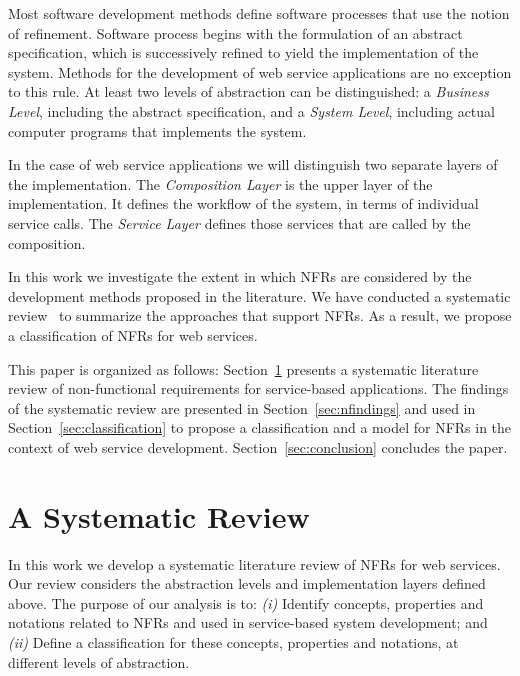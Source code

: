\documentclass[english,12pt]{article}
\begin{document}
Most software development methods define software processes that use the notion of refinement.
Software process begins with the formulation of an abstract specification, which is successively refined to yield the implementation of the system.
Methods for the development of web service applications are no exception to this rule.
At least two levels of abstraction can be distinguished: a \textit{Business Level}, including the abstract specification, and a \textit{System Level}, including actual computer programs that implements the system.

In the case of web service applications we will distinguish two separate layers of the implementation.
The \textit{Composition Layer} is the upper layer of the implementation. 
It defines the workflow of the system, in terms of individual service calls.
The \textit{Service Layer} defines those services that are called by the composition.

\bigskip
 
In this work we investigate the extent in which NFRs are considered by the development methods proposed in the literature.
We have conducted a systematic review~\cite{Kitchenham08} to summarize the approaches that support NFRs.
As a result, we propose a classification of NFRs for web services.

\bigskip

This paper is organized as follows: 
Section~\ref{sec:sr} presents a systematic literature review of non-functional requirements for service-based applications.
The findings of the systematic review are presented in Section~\ref{sec:nfindings} and used in Section~\ref{sec:classification} to propose a classification and a model for NFRs in the context of web service development. 
Section~\ref{sec:conclusion} concludes the paper.


\section{A Systematic Review}  
\label{sec:sr}

In this work we develop a systematic literature review of NFRs for web services. 
Our review considers the abstraction levels and implementation layers defined above. 
%
The purpose of our analysis is to: 
\textit{(i)} Identify concepts, properties and notations related to NFRs and used in service-based system development; and 
\textit{(ii)} Define a classification for these concepts, properties and notations, at different  levels of abstraction.
\end{document}
